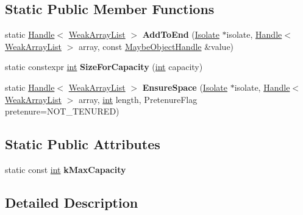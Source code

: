 \subsection*{Static Public Member Functions}
\begin{DoxyCompactItemize}
\item 
\mbox{\label{classv8_1_1internal_1_1WeakArrayList_a21920ce7e9d13086c1451d9541dc8840}} 
static \mbox{\hyperlink{classv8_1_1internal_1_1Handle}{Handle}}$<$ \mbox{\hyperlink{classv8_1_1internal_1_1WeakArrayList}{Weak\+Array\+List}} $>$ {\bfseries Add\+To\+End} (\mbox{\hyperlink{classv8_1_1internal_1_1Isolate}{Isolate}} $\ast$isolate, \mbox{\hyperlink{classv8_1_1internal_1_1Handle}{Handle}}$<$ \mbox{\hyperlink{classv8_1_1internal_1_1WeakArrayList}{Weak\+Array\+List}} $>$ array, const \mbox{\hyperlink{classv8_1_1internal_1_1MaybeObjectHandle}{Maybe\+Object\+Handle}} \&value)
\item 
\mbox{\label{classv8_1_1internal_1_1WeakArrayList_a7b1758f08880d0869e4a5713ef013582}} 
static constexpr \mbox{\hyperlink{classint}{int}} {\bfseries Size\+For\+Capacity} (\mbox{\hyperlink{classint}{int}} capacity)
\item 
\mbox{\label{classv8_1_1internal_1_1WeakArrayList_a8f04a7a79f9d0e0bda21e59f17d6bfaf}} 
static \mbox{\hyperlink{classv8_1_1internal_1_1Handle}{Handle}}$<$ \mbox{\hyperlink{classv8_1_1internal_1_1WeakArrayList}{Weak\+Array\+List}} $>$ {\bfseries Ensure\+Space} (\mbox{\hyperlink{classv8_1_1internal_1_1Isolate}{Isolate}} $\ast$isolate, \mbox{\hyperlink{classv8_1_1internal_1_1Handle}{Handle}}$<$ \mbox{\hyperlink{classv8_1_1internal_1_1WeakArrayList}{Weak\+Array\+List}} $>$ array, \mbox{\hyperlink{classint}{int}} length, Pretenure\+Flag pretenure=N\+O\+T\+\_\+\+T\+E\+N\+U\+R\+ED)
\end{DoxyCompactItemize}
\subsection*{Static Public Attributes}
\begin{DoxyCompactItemize}
\item 
static const \mbox{\hyperlink{classint}{int}} {\bfseries k\+Max\+Capacity}
\end{DoxyCompactItemize}


\subsection{Detailed Description}


